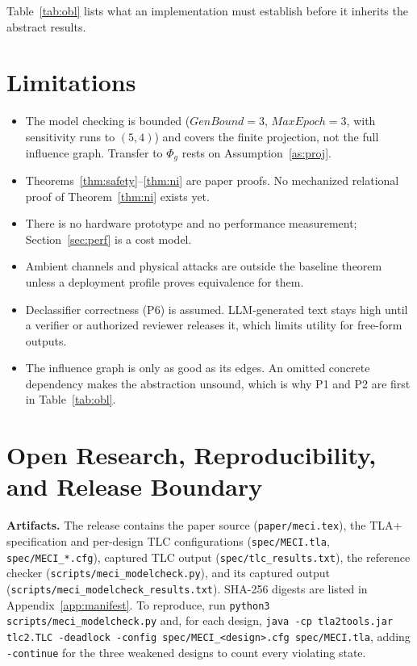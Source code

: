 \documentclass[11pt,letterpaper]{article}
\theoremstyle{plain}
\theoremstyle{definition}
\begin{document}
Table~\ref{tab:obl} lists what an implementation must establish before it inherits the abstract results.

\section{Limitations}\label{sec:limits}

\begin{itemize}[leftmargin=*,itemsep=1pt]
\item The model checking is bounded ($\mathit{GenBound}=3$, $\mathit{MaxEpoch}=3$, with sensitivity runs to $(5,4)$) and covers the finite projection, not the full influence graph. Transfer to $\Phi_g$ rests on Assumption~\ref{as:proj}.
\item Theorems~\ref{thm:safety}--\ref{thm:ni} are paper proofs. No mechanized relational proof of Theorem~\ref{thm:ni} exists yet.
\item There is no hardware prototype and no performance measurement; Section~\ref{sec:perf} is a cost model.
\item Ambient channels and physical attacks are outside the baseline theorem unless a deployment profile proves equivalence for them.
\item Declassifier correctness (P6) is assumed. LLM-generated text stays high until a verifier or authorized reviewer releases it, which limits utility for free-form outputs.
\item The influence graph is only as good as its edges. An omitted concrete dependency makes the abstraction unsound, which is why P1 and P2 are first in Table~\ref{tab:obl}.
\end{itemize}

\section{Open Research, Reproducibility, and Release Boundary}\label{sec:release}

\textbf{Artifacts.} The release contains the paper source (\texttt{paper/meci.tex}), the TLA+ specification and per-design TLC configurations (\texttt{spec/MECI.tla}, \texttt{spec/MECI\_*.cfg}), captured TLC output (\texttt{spec/tlc\_results.txt}), the reference checker (\texttt{scripts/meci\_modelcheck.py}), and its captured output (\texttt{scripts/meci\_modelcheck\_results.txt}). SHA-256 digests are listed in Appendix~\ref{app:manifest}. To reproduce, run \texttt{python3 scripts/meci\_modelcheck.py} and, for each design, \texttt{java -cp tla2tools.jar tlc2.TLC -deadlock -config spec/MECI\_<design>.cfg spec/MECI.tla}, adding \texttt{-continue} for the three weakened designs to count every violating state.
\end{document}
